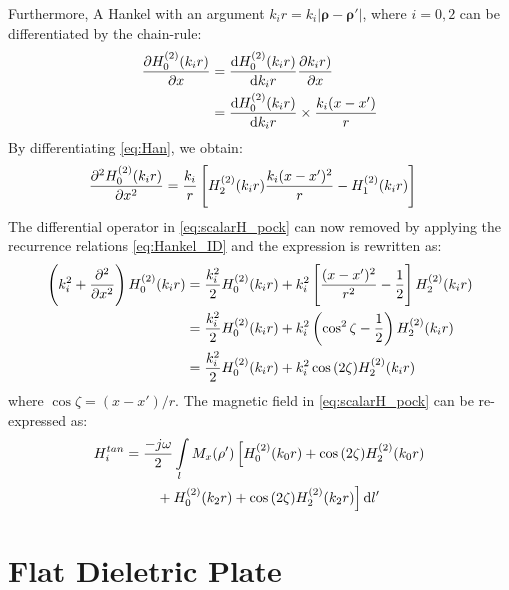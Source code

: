 \documentclass[11pt]{article}
\renewcommand{\v}[1]{\mathbf{#1}} %
\renewcommand{\O}{\omega}  %
\newcommand{\p}{\rho}  %
\newcommand{\x}{\times}  %
\renewcommand{\^}{\hat}  %
\newcommand*\diff{\mathop{}\!\mathrm{d}} %
\begin{document}
%
Furthermore, A Hankel with an argument $ k_i r = k_i|\v \p - \v \p'|$, where $i = 0,2$ can be differentiated by the chain-rule:
%
\begin{equation}
  \begin{split}
    \pdv{H_0^{(2)}(k_i r)}{x} &= \dv{H_0^{(2)}(k_i r)}{k_i r} \pdv{k_i r)}{x} \\
    &= \dv{H_0^{(2)}(k_i r)}{k_i r} \x \frac{k_i (x - x')}{r}
  \end{split}
  \label{eq:Han}
\end{equation}
%
By differentiating \eqref{eq:Han}, we obtain:
%
\begin{align}
  \pdv[2]{H_0^{(2)}(k_i r)}{x} &= \frac{k_i}{r} \left[H_2^{(2)}(k_i r) \frac{k_i (x - x')^2}{r} - H_1^{(2)}(k_i r) \right]
  \label{eq:difHan}
\end{align}
%
The differential operator in \eqref{eq:scalarH_pock} can now removed by applying the recurrence relations \eqref{eq:Hankel_ID} and the expression is rewritten as:
%
\begin{equation}
  \begin{split}
    \left(k_i^2 + \pdv[2]{}{x} \right) H_0^{(2)}(k_i r) &= \frac{k_i^2}{2} H_0^{(2)}(k_i r) + k_i^2 \left[ \frac{(x-x')^2}{r^2} - \frac{1}{2} \right] H_2^{(2)}(k_i r) \\
    &= \frac{k_i^2}{2} H_0^{(2)}(k_i r) + k_i^2 \left( \cos^2 \zeta - \frac{1}{2} \right) H_2^{(2)}(k_i r) \\
    &= \frac{k_i^2}{2} H_0^{(2)}(k_i r) + k_i^2 \cos {(2\zeta)} H_2^{(2)}(k_i r)
  \end{split}
  \label{eq:Hankel_final}
\end{equation}
%
where $\cos \zeta = {(x-x')/r}$. The magnetic field in \eqref{eq:scalarH_pock} can be re-expressed as:
%
\begin{align}
  H_i^{tan} &=  \frac{-j \O}{2} \int\limits_{l} M_x(\v \p') \left[ H_0^{(2)}(k_0 r) + \cos {(2 \zeta)} H_2^{(2)}(k_0 r) \right. \notag\\
  &\qquad \left. {} + H_0^{(2)}(k_2 r) + \cos {(2\zeta)} H_2^{(2)}(k_2 r)\right]\diff{l'}
  \label{eq:H_final}
\end{align}

\section{Flat Dieletric Plate}
\end{document}
